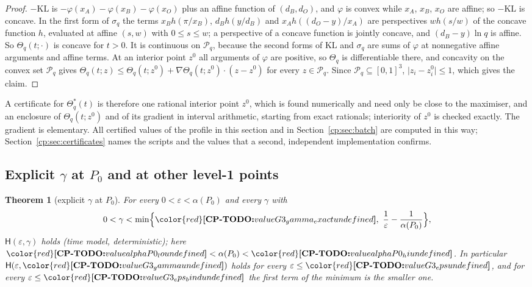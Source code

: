 \documentclass[11pt]{article}
\makeatletter
\newtheorem{theorem}{Theorem}[section]
\theoremstyle{definition}
\theoremstyle{remark}
\DeclareRobustCommand{\CPTODO}[1]{{\color{red}\textbf{[CP-TODO:} #1\textbf{]}}}
\providecommand{\eps}{\varepsilon}
\newcommand{\abs}[1]{\lvert #1\rvert}
\newcommand{\Hb}{h}                           %
\newcommand{\Hyp}{\mathsf{H}}                 %
\newcommand{\Pzero}{P_0}                      %
\newcommand{\KL}{\mathrm{KL}}                        %
\newcommand{\Polq}{\mathcal P}                       %
\newcommand{\cpv}[1]{\ifcsname cpv@#1\endcsname\csname cpv@#1\endcsname\else\CPTODO{value #1 undefined}\fi}
\makeatother
\begin{document}
\begin{proof}
$-\KL$ is $-\varphi(x_A)-\varphi(x_B)-\varphi(x_O)$ plus an affine function of $(d_B,d_O)$, and $\varphi$ is convex while $x_A$, $x_B$, $x_O$ are affine; so $-\KL$ is concave. In the first form of $\sigma_q$ the terms $x_B\Hb(\pi/x_B)$, $d_B\Hb(y/d_B)$ and $x_A\Hb((d_O-y)/x_A)$ are perspectives $w\Hb(s/w)$ of the concave function $\Hb$, evaluated at affine $(s,w)$ with $0\le s\le w$; a perspective of a concave function is jointly concave, and $(d_B-y)\ln q$ is affine. So $\Theta_q(t;\cdot)$ is concave for $t>0$. It is continuous on $\Polq_q$, because the second forms of $\KL$ and $\sigma_q$ are sums of $\varphi$ at nonnegative affine arguments and affine terms. At an interior point $z^0$ all arguments of $\varphi$ are positive, so $\Theta_q$ is differentiable there, and concavity on the convex set $\Polq_q$ gives $\Theta_q(t;z)\le\Theta_q(t;z^0)+\nabla\Theta_q(t;z^0)\cdot(z-z^0)$ for every $z\in\Polq_q$. Since $\Polq_q\subseteq[0,1]^3$, $\abs{z_i-z^0_i}\le1$, which gives the claim.
\end{proof}

A certificate for $\Theta^*_q(t)$ is therefore one rational interior point $z^0$, which is found numerically and need only be close to the maximiser, and an enclosure of $\Theta_q(t;z^0)$ and of its gradient in interval arithmetic, starting from exact rationals; interiority of $z^0$ is checked exactly. The gradient is elementary. All certified values of the profile in this section and in Section~\ref{cp:sec:batch} are computed in this way; Section~\ref{cp:sec:certificates} names the scripts and the values that a second, independent implementation confirms.

\subsection{Explicit \texorpdfstring{$\gamma$}{gamma} at \texorpdfstring{$\Pzero$}{P0} and at other level-1 points}\label{cp:sec:explicit}

\begin{theorem}[explicit $\gamma$ at $\Pzero$]\label{cp:G3}
For every $0<\eps<\alpha(\Pzero)$ and every $\gamma$ with
\[
0<\gamma<\min\Bigl\{\cpv{G3_gamma_exact},\ \frac1\eps-\frac1{\alpha(\Pzero)}\Bigr\},
\]
$\Hyp(\eps,\gamma)$ holds (time model, deterministic); here $\cpv{alphaP0_lo}<\alpha(\Pzero)<\cpv{alphaP0_hi}$. In particular $\Hyp(\eps,\cpv{G3_gamma})$ holds for every $\eps\le\cpv{G3_eps}$, and for every $\eps\le\cpv{G3_eps_bind}$ the first term of the minimum is the smaller one.
\end{theorem}
\end{document}
